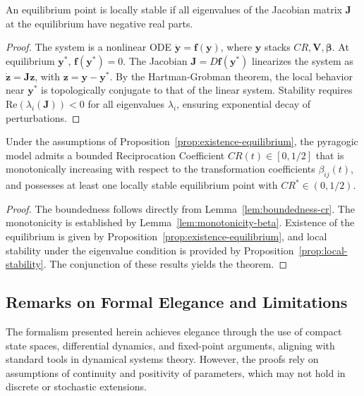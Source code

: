 \begin{proposition}
	\label{prop:local-stability}
	An equilibrium point is locally stable if all eigenvalues of the Jacobian matrix \(\mathbf{J}\) at the equilibrium have negative real parts.
\end{proposition}

\begin{proof}
	The system is a nonlinear ODE \(\dot{\mathbf{y}} = \mathbf{f}(\mathbf{y})\), where \(\mathbf{y}\) stacks \(CR, \mathbf{V}, \boldsymbol{\beta}\). At equilibrium \(\mathbf{y}^*\), \(\mathbf{f}(\mathbf{y}^*) = 0\). The Jacobian \(\mathbf{J} = D\mathbf{f}(\mathbf{y}^*)\) linearizes the system as \(\dot{\mathbf{z}} = \mathbf{J} \mathbf{z}\), with \(\mathbf{z} = \mathbf{y} - \mathbf{y}^*\). By the Hartman-Grobman theorem, the local behavior near \(\mathbf{y}^*\) is topologically conjugate to that of the linear system. Stability requires \(\text{Re}(\lambda_i(\mathbf{J})) < 0\) for all eigenvalues \(\lambda_i\), ensuring exponential decay of perturbations.
\end{proof}

\begin{theorem}
	\label{thm:main-pyragogic-reciprocity}
	Under the assumptions of Proposition~\ref{prop:existence-equilibrium}, the pyragogic model admits a bounded Reciprocation Coefficient \(CR(t) \in [0,1/2]\) that is monotonically increasing with respect to the transformation coefficients \(\beta_{ij}(t)\), and possesses at least one locally stable equilibrium point with \(CR^* \in (0,1/2)\).
\end{theorem}

\begin{proof}
	The boundedness follows directly from Lemma~\ref{lem:boundedness-cr}. The monotonicity is established by Lemma~\ref{lem:monotonicity-beta}. Existence of the equilibrium is given by Proposition~\ref{prop:existence-equilibrium}, and local stability under the eigenvalue condition is provided by Proposition~\ref{prop:local-stability}. The conjunction of these results yields the theorem.
\end{proof}

\newpage
\subsection{Remarks on Formal Elegance and Limitations}

The formalism presented herein achieves elegance through the use of compact state spaces, differential dynamics, and fixed-point arguments, aligning with standard tools in dynamical systems theory. However, the proofs rely on assumptions of continuity and positivity of parameters, which may not hold in discrete or stochastic extensions. 

